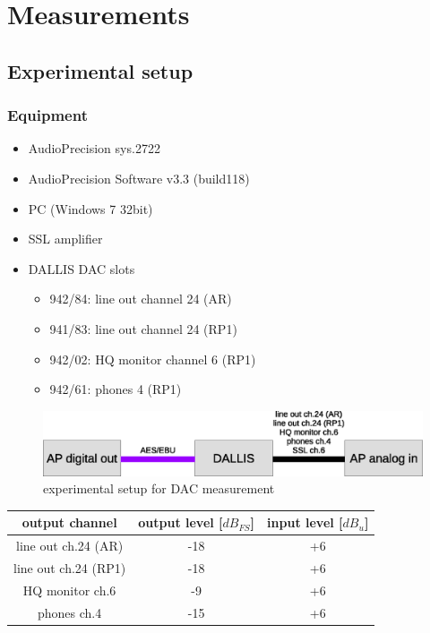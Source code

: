 \documentclass[11pt]{report}
\begin{document}
\section{Measurements}
	\subsection{Experimental setup}
		\subsubsection{Equipment}
\begin{itemize}
\item AudioPrecision sys.2722
\item AudioPrecision Software v3.3 (build118)
\item PC (Windows 7 32bit)
\item SSL amplifier
\item DALLIS DAC slots
\begin{itemize}
\item 942/84: line out channel 24 (AR)
\item 941/83: line out channel 24 (RP1)
\item 942/02: HQ monitor channel 6 (RP1)
\item 942/61: phones 4 (RP1)
\end{itemize}
\end{itemize}

\begin{figure}[htbp]
\begin{center}
\includegraphics[width=14cm,keepaspectratio=true]{DACstructure}
\caption{experimental setup for DAC measurement}
\label{fig:dacstructure}
\end{center}
\end{figure}

\begin{center}
\begin{tabular}{|c||c|c|}
\hline 
output channel  & 	output level [$dB_{FS}$]&		input level [$dB_u$]\\ \hline
line out ch.24 (AR) &	-18 &	+6\\
line out ch.24 (RP1) &	-18 &		+6\\
HQ monitor ch.6 &	-9 		& +6\\
phones ch.4 &	-15 &	+6\\
\hline
\end{tabular}
\end{center}
\end{document}
